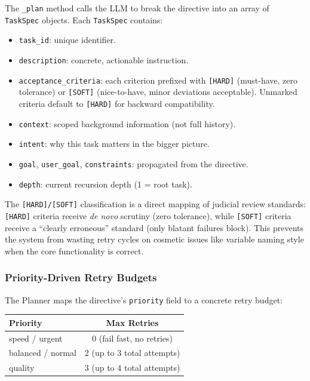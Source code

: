 \documentclass[11pt,a4paper]{article}
\begin{document}
The \texttt{\_plan} method calls the LLM to break the directive into an array
of \texttt{TaskSpec} objects. Each \texttt{TaskSpec} contains:

\begin{itemize}[leftmargin=*,itemsep=2pt]
    \item \texttt{task\_id}: unique identifier.
    \item \texttt{description}: concrete, actionable instruction.
    \item \texttt{acceptance\_criteria}: each criterion prefixed with
    \texttt{[HARD]} (must-have, zero tolerance) or \texttt{[SOFT]}
    (nice-to-have, minor deviations acceptable). Unmarked criteria default
    to \texttt{[HARD]} for backward compatibility.
    \item \texttt{context}: scoped background information (not full history).
    \item \texttt{intent}: why this task matters in the bigger picture.
    \item \texttt{goal}, \texttt{user\_goal}, \texttt{constraints}: propagated
    from the directive.
    \item \texttt{depth}: current recursion depth (1 = root task).
\end{itemize}

The \texttt{[HARD]/[SOFT]} classification is a direct mapping of judicial
review standards: \texttt{[HARD]} criteria receive \emph{de novo} scrutiny
(zero tolerance), while \texttt{[SOFT]} criteria receive a ``clearly
erroneous'' standard (only blatant failures block). This prevents the system
from wasting retry cycles on cosmetic issues like variable naming style when
the core functionality is correct.

\subsubsection*{Priority-Driven Retry Budgets}

The Planner maps the directive's \texttt{priority} field to a concrete retry
budget:

\begin{center}
\begin{tabular}{lc}
\toprule
\textbf{Priority} & \textbf{Max Retries} \\
\midrule
speed / urgent & 0 (fail fast, no retries) \\
balanced / normal & 2 (up to 3 total attempts) \\
quality & 3 (up to 4 total attempts) \\
\bottomrule
\end{tabular}
\end{center}
\end{document}

